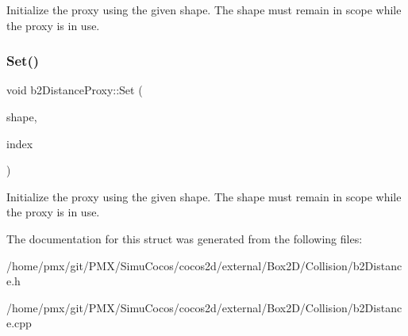 Initialize the proxy using the given shape. The shape must remain in scope while the proxy is in use. \mbox{\label{structb2DistanceProxy_a80a59a9c9e952482a8fc6db4b883365d}} 
\subsubsection{\texorpdfstring{Set()}{Set()}\hspace{0.1cm}{\footnotesize\ttfamily [2/2]}}
{\footnotesize\ttfamily void b2\+Distance\+Proxy\+::\+Set (\begin{DoxyParamCaption}\item[{const \hyperlink{classb2Shape}{b2\+Shape} $\ast$}]{shape,  }\item[{int32}]{index }\end{DoxyParamCaption})}

Initialize the proxy using the given shape. The shape must remain in scope while the proxy is in use. 

The documentation for this struct was generated from the following files\+:\begin{DoxyCompactItemize}
\item 
/home/pmx/git/\+P\+M\+X/\+Simu\+Cocos/cocos2d/external/\+Box2\+D/\+Collision/b2\+Distance.\+h\item 
/home/pmx/git/\+P\+M\+X/\+Simu\+Cocos/cocos2d/external/\+Box2\+D/\+Collision/b2\+Distance.\+cpp\end{DoxyCompactItemize}
